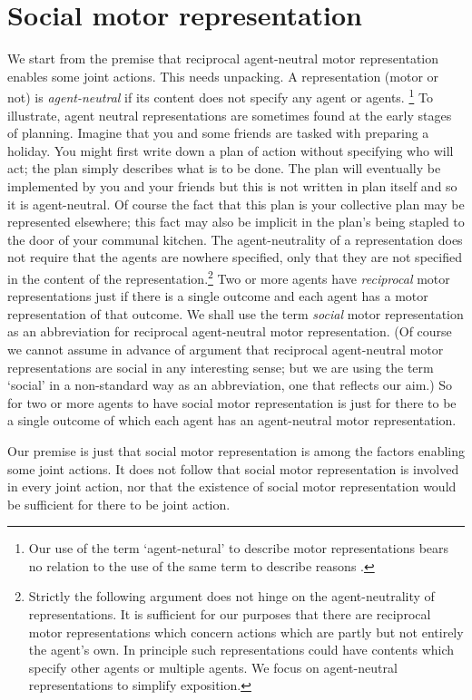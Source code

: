 \documentclass[12pt,\papersize]{extarticle}
\begin{document}
\section{Social motor representation}
We start from the premise that reciprocal agent-neutral motor representation enables some joint actions.
This needs unpacking.
A representation (motor or not) is \emph{agent-neutral} if its content does not specify any agent or agents.%
\footnote{
Our use of the term `agent-netural' to describe motor representations bears no relation to the use of the same term  to describe reasons \citep[on the latter, see][]{Parfit:1984fk}.
}
To illustrate, agent neutral representations are sometimes found at the early stages of planning.
Imagine that you and some friends are tasked with preparing a holiday.  
You might first write down a plan of action without specifying who will act; the plan simply describes what is to be done.
The plan  will eventually be implemented by you and your friends
 but this is not written in plan itself  and so it is agent-neutral.
Of course the fact that this plan is your collective plan may be represented elsewhere; this fact may also be implicit in  the plan's being stapled to the door of your communal kitchen.
The agent-neutrality of a representation does not require that the agents are nowhere specified, only that they are not specified in the content of the representation.\footnote{
Strictly the following argument does not hinge on the agent-neutrality of representations.
It is sufficient for our purposes that there are reciprocal motor representations which concern actions which are partly but not entirely the agent's own.
In principle such representations could have contents which specify other agents or multiple agents.
We focus on agent-neutral representations to simplify exposition.
}
Two or more agents have \emph{reciprocal} motor representations  just if there is a single outcome and each agent has a motor representation of that outcome.
We shall use the term \emph{social} motor representation as an abbreviation for reciprocal agent-neutral motor representation.
(Of course we cannot assume in advance of argument that reciprocal agent-neutral motor representations are social in any interesting sense;
but we are using the term `social' in a non-standard way as an abbreviation, one that reflects our aim.)
So for two or more agents to have social motor representation is just for there to be a single outcome of which each agent has an agent-neutral motor representation.

Our premise is just that social motor representation is among the factors enabling some joint actions.
It does not follow that social motor representation is involved in every joint action,
nor that the existence of social motor representation would be sufficient for there to be joint action.
\end{document}
